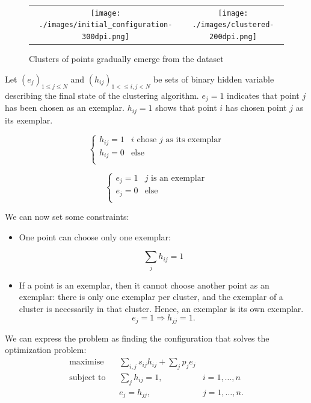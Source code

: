 \documentclass{ipol}
\begin{document}
\begin{figure}
\begin{tabular}{cc}
\texttt{[image: ./images/initial\_configuration-300dpi.png]} &
\texttt{[image: ./images/clustered-200dpi.png]} \\
\end{tabular}
\caption{Clusters of points gradually emerge from the dataset}
\end{figure}

Let $(e_j)_{1 \leq j \leq N}$ and $(h_{ij})_{1 < \leq i, j < N}$ be sets of
binary hidden variable describing the final state of the clustering algorithm.
$e_j = 1$ indicates that point $j$ has been chosen as an exemplar. $h_{ij} =
1$ shows that point $i$ has chosen point $j$ as its exemplar. 

\begin{equation*}
\begin{cases}
  h_{ij} = 1 & \text{$i$ chose $j$ as its exemplar}\\
  h_{ij} = 0 & \text{else} \\
\end{cases}
\end{equation*}

\begin{equation*}
\begin{cases}
e_j = 1 & \text{$j$ is an exemplar} \\
e_j = 0 & \text{else} \\
\end{cases}
\end{equation*}

We can now set some constraints:

\begin{itemize}
\item One point can choose only one exemplar:

\begin{equation}
\sum_j h_{ij} = 1
\end{equation}

\item If a point is an exemplar, then it cannot choose another point as an
exemplar: there is only one exemplar per cluster, and the exemplar of a
cluster is necessarily in that cluster. Hence, an exemplar is its own
exemplar.
\begin{equation*}
e_{j} = 1 \Rightarrow h_{jj} = 1.
\end{equation*}
\end{itemize}

We can express the problem as finding the configuration that solves the
optimization problem:
\begin{equation*}
\renewcommand{\arraystretch}{2}
\begin{array}{ccll}
\text{maximise} & & \sum_{i, j} s_{ij} h_{ij} + \sum_{j} p_j e_j & \\
\text{subject to} &  & \sum_{j} h_{ij} = 1, & i = 1, \dots, n \\
		  &  & e_{j} = h_{jj}, & j = 1, \dots, n.\\
\end{array}
\end{equation*}
\end{document}
